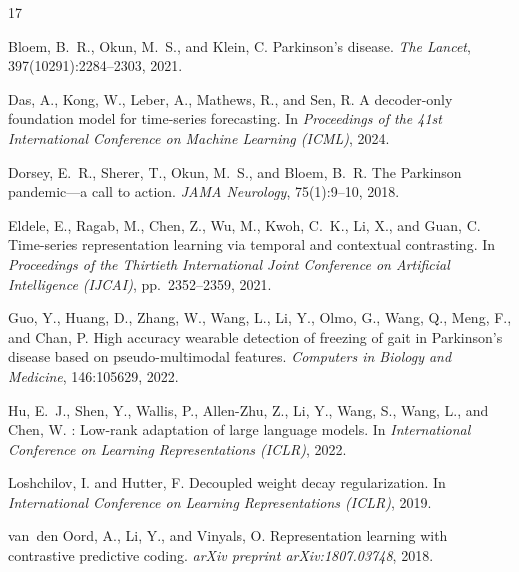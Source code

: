 \documentclass[pmlr]{jmlr}
\begin{document}
\begin{thebibliography}{17}
\providecommand{\natexlab}[1]{#1}

Bloem, B.~R., Okun, M.~S., and Klein, C.
\newblock Parkinson's disease.
\newblock \emph{The Lancet}, 397(10291):2284--2303, 2021.

Das, A., Kong, W., Leber, A., Mathews, R., and Sen, R.
\newblock A decoder-only foundation model for time-series forecasting.
\newblock In \emph{Proceedings of the 41st International Conference on Machine
  Learning (ICML)}, 2024.

Dorsey, E.~R., Sherer, T., Okun, M.~S., and Bloem, B.~R.
\newblock The {Parkinson} pandemic---a call to action.
\newblock \emph{JAMA Neurology}, 75(1):9--10, 2018.

Eldele, E., Ragab, M., Chen, Z., Wu, M., Kwoh, C.~K., Li, X., and Guan, C.
\newblock Time-series representation learning via temporal and contextual
  contrasting.
\newblock In \emph{Proceedings of the Thirtieth International Joint Conference
  on Artificial Intelligence (IJCAI)}, pp.\  2352--2359, 2021.

Guo, Y., Huang, D., Zhang, W., Wang, L., Li, Y., Olmo, G., Wang, Q., Meng,
  F., and Chan, P.
\newblock High accuracy wearable detection of freezing of gait in {Parkinson's}
  disease based on pseudo-multimodal features.
\newblock \emph{Computers in Biology and Medicine}, 146:105629, 2022.

Hu, E.~J., Shen, Y., Wallis, P., Allen-Zhu, Z., Li, Y., Wang, S., Wang, L.,
  and Chen, W.
: Low-rank adaptation of large language models.
\newblock In \emph{International Conference on Learning Representations
  (ICLR)}, 2022.

Loshchilov, I. and Hutter, F.
\newblock Decoupled weight decay regularization.
\newblock In \emph{International Conference on Learning Representations
  (ICLR)}, 2019.

van~den Oord, A., Li, Y., and Vinyals, O.
\newblock Representation learning with contrastive predictive coding.
\newblock \emph{arXiv preprint arXiv:1807.03748}, 2018.


\end{thebibliography}
\end{document}
